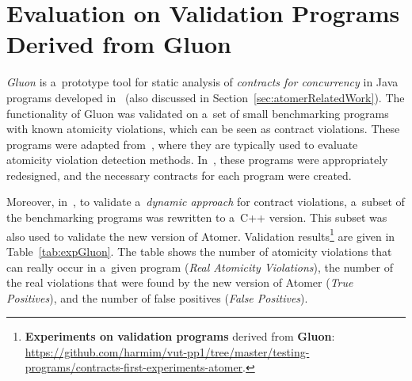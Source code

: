 \section{Evaluation on Validation Programs Derived from Gluon}
\label{sec:expGluon}

\emph{Gluon} is a~prototype tool for static analysis of \emph{contracts for concurrency} in Java programs developed in~\cite{contracts2017, contracts2015} (also discussed in Section~\ref{sec:atomerRelatedWork}). The functionality of Gluon was validated on a~set of small benchmarking programs with known atomicity violations, which can be seen as contract violations. These programs were adapted from~\cite{hlDataRaces, blockLocalAtom, atomicityOOP}, where they are typically used to evaluate atomicity violation detection methods. In~\cite{contracts2017, contracts2015}, these programs were appropriately redesigned, and the necessary contracts for each program were created.

Moreover, in~\cite{contracts2017}, to validate a~\emph{dynamic approach} for contract violations, a~subset of the benchmarking programs was rewritten to a~C++ version. This subset was also used to validate the new version of Atomer. Validation results\footnote{\textbf{Experiments on validation programs} derived from \textbf{Gluon}: \url{https://github.com/harmim/vut-pp1/tree/master/testing-programs/contracts-first-experiments-atomer}.} are given in Table~\ref{tab:expGluon}. The table shows the number of atomicity violations that can really occur in a~given program (\emph{Real Atomicity Violations}), the number of the real violations that were found by the new version of Atomer (\emph{True Positives}), and the number of false positives (\emph{False Positives}).

